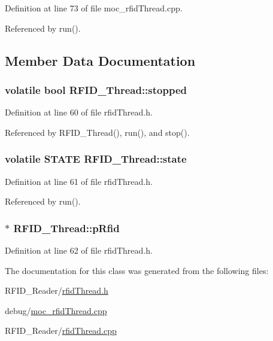 Definition at line 73 of file moc\_\-rfidThread.cpp.

Referenced by run().

\subsection{Member Data Documentation}
\hypertarget{class_r_f_i_d___thread_0ac912c1f590f586b9908beadf6c2b0f}{
\subsubsection[stopped]{\setlength{\rightskip}{0pt plus 5cm}volatile bool {\bf RFID\_\-Thread::stopped}}}
\label{class_r_f_i_d___thread_0ac912c1f590f586b9908beadf6c2b0f}




Definition at line 60 of file rfidThread.h.

Referenced by RFID\_\-Thread(), run(), and stop().\hypertarget{class_r_f_i_d___thread_9d15987c8d3a0b8e53e936da8e50bdd6}{
\subsubsection[state]{\setlength{\rightskip}{0pt plus 5cm}volatile {\bf STATE} {\bf RFID\_\-Thread::state}}}
\label{class_r_f_i_d___thread_9d15987c8d3a0b8e53e936da8e50bdd6}




Definition at line 61 of file rfidThread.h.

Referenced by run().\hypertarget{class_r_f_i_d___thread_d25fbcccbbe6d4094736f1bf1b681b7f}{
\subsubsection[pRfid]{$\ast$ {\bf RFID\_\-Thread::pRfid}}}
\label{class_r_f_i_d___thread_d25fbcccbbe6d4094736f1bf1b681b7f}




Definition at line 62 of file rfidThread.h.

The documentation for this class was generated from the following files:\begin{CompactItemize}
\item 
RFID\_\-Reader/\hyperlink{rfid_thread_8h}{rfidThread.h}\item 
debug/\hyperlink{moc__rfid_thread_8cpp}{moc\_\-rfidThread.cpp}\item 
RFID\_\-Reader/\hyperlink{rfid_thread_8cpp}{rfidThread.cpp}\end{CompactItemize}
